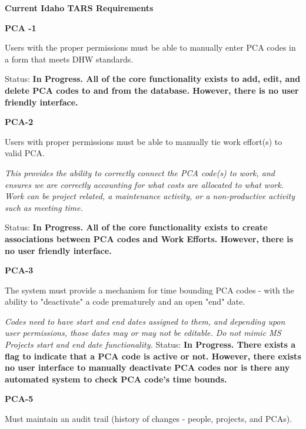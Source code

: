 \documentclass{article}
\begin{document}

\noindent \textbf{Current Idaho TARS Requirements}

\noindent \textit{}

\noindent \textbf{PCA -1}

\noindent Users with the proper permissions must be able to manually enter PCA codes in a form that meets DHW standards.

\noindent Status: \textbf{In Progress.  All of the core functionality exists to add, edit, and delete PCA codes to and from the database.  However, there is no user friendly interface.}

\noindent \textit{}


\noindent \textbf{PCA-2}

\noindent Users with proper permissions must be able to manually tie work effort(s) to valid PCA.

\noindent \textit{This provides the ability to correctly connect the PCA code(s) to work, and ensures we are correctly accounting for what costs are allocated to what work. Work can be project related, a maintenance activity, or a non-productive activity such as meeting time.}

Status: \textbf{In Progress.  All of the core functionality exists to create associations between PCA codes and Work Efforts.  However, there is no user friendly interface.}

\noindent \textit{}


\noindent \textbf{PCA-3}

\noindent The system must provide a mechanism for time bounding PCA codes - with the ability to "deactivate" a code prematurely and an open "end" date.

\noindent \textit{Codes need to have start and end dates assigned to them, and depending upon user permissions, those dates may or may not be editable. Do not mimic MS Projects start and end date functionality.}
\noindent Status: \textbf{In Progress.  There exists a flag to indicate that a PCA code is active or not.  However, there exists no user interface to manually deactivate PCA codes nor is there any automated system to check PCA code's time bounds.}

\noindent \textit{}


\noindent \textbf{PCA-5}

\noindent Must maintain an audit trail (history of changes - people, projects, and PCAs).
\end{document}
